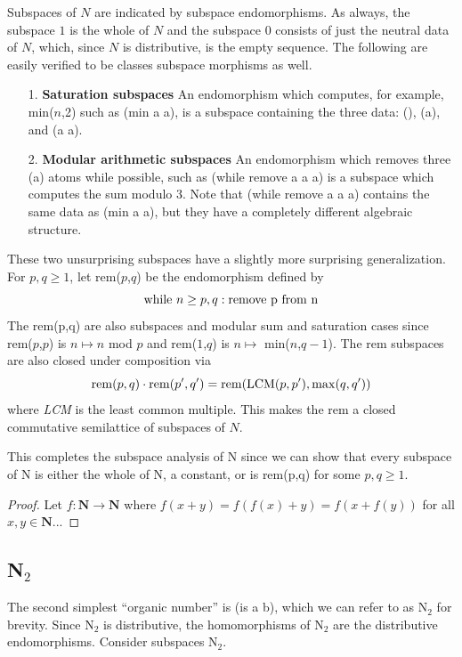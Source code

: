 \documentclass[11pt]{article}
\begin{document}
    Subspaces of $N$ are indicated by subspace endomorphisms.  As always, the subspace $1$ is the whole of $N$ and the subspace $0$ consists of just the neutral data of $N$, which, 
since $N$ is distributive, is the empty sequence.  The following are easily verified to be classes subspace morphisms as well.  
\begin{itemize} 
\item [1.] {\bf Saturation subspaces} An endomorphism which computes, for example, min($n$,2) such as (min a a), is a subspace containing the three data: (), (a), and (a a). 
\item [2.] {\bf Modular arithmetic subspaces} An endomorphism which removes three (a) atoms while possible, such as (while remove a a a) is a subspace which computes the sum modulo 3.  Note 
that (while remove a a a) contains the same data as (min a a), but they have a completely different algebraic structure.  
\end{itemize}
These two unsurprising subspaces have a slightly more surprising generalization.  For $p,q\ge 1$, let rem($p$,$q$) be the endomorphism defined by 
\begin{equation}
{\rm while}\ n\ge p,q: {\rm remove\ p\ from\ n}
\end{equation}
The rem(p,q) are also subspaces and modular sum and saturation cases since rem($p$,$p$) is $n\mapsto n$ mod $p$ and rem($1$,$q$) is $n\mapsto$ min($n$,$q-1$).   The rem subspaces are also closed under composition via 
\begin{equation}
{\rm rem}(p,q)\cdot {\rm rem}(p',q') = {\rm rem}({\rm LCM}(p,p'),{\rm max}(q,q'))
\end{equation}
where {\it LCM} is the least common multiple.  This makes the rem a closed commutative semilattice of subspaces of $N$.  

This completes the subspace analysis of N since we can show that every subspace of N is either the whole of N, a constant, or is rem(p,q) for some $p,q\ge1$. 

\begin{proof}
Let $f:{\mathbf N}\rightarrow{\mathbf N}$ where $f(x+y)=f(f(x)+y)=f(x+f(y))$ for all $x,y\in\mathbf N$...
\end{proof}

\subsection{N$_2$} 

The second simplest ``organic number'' is (is a b), which we can refer to as N$_2$ for brevity.  Since N$_2$ is distributive, the homomorphisms of N$_2$ 
are the distributive endomorphisms.  Consider subspaces N$_2$.  
\end{document}
